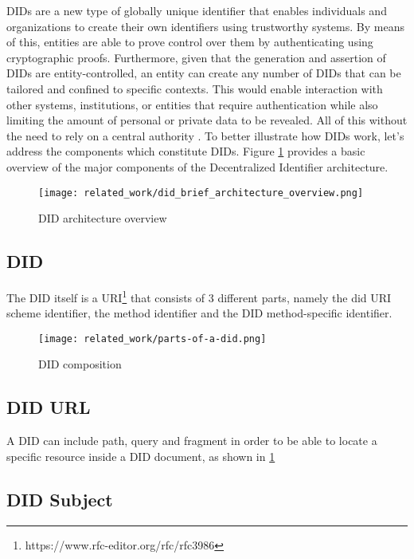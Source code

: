 DIDs are a new type of globally unique identifier that enables individuals and organizations to create their own identifiers using trustworthy systems. By means of this, entities are able to prove control over them by authenticating using cryptographic proofs. Furthermore, given that the generation and assertion of DIDs are entity-controlled, an entity can create any number of DIDs that can be tailored and confined to specific contexts. This would enable interaction with other systems, institutions, or entities that require authentication while also limiting the amount of personal or private data to be revealed. All of this without the need to rely on a central authority \cite{sporny_longley_sabadello_reed_steele_2021}. To better illustrate how DIDs work, let's address the components which constitute DIDs. Figure \ref{fig:did_architecture} provides a basic overview of the major components of the Decentralized Identifier architecture.

\begin{figure}[H]
  \centering
  \texttt{[image: related\_work/did\_brief\_architecture\_overview.png]}
  \caption{DID architecture overview \cite{sporny_longley_sabadello_reed_steele_2021}}
  \label{fig:did_architecture}
\end{figure}

\subsection{DID}  
The DID itself is a URI\footnote{https://www.rfc-editor.org/rfc/rfc3986} that consists of 3 different parts, namely the did URI scheme identifier, the method identifier and the DID method-specific identifier.

\begin{figure}[h]
  \centering
  \texttt{[image: related\_work/parts-of-a-did.png]}
  \caption{DID composition \cite{sporny_longley_sabadello_reed_steele_2021}}
  \label{fig:did}
\end{figure}

\subsection{DID URL}

A DID can include path, query and fragment in order to be able to locate a specific resource inside a DID document, as shown in \ref{fig:did_architecture}


\subsection{DID Subject}

